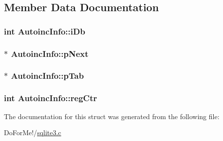 \subsection{Member Data Documentation}
\hypertarget{struct_autoinc_info_ae7234e0916b11ef97377bdfd6c7c4568}{
\subsubsection[{i\-Db}]{\setlength{\rightskip}{0pt plus 5cm}int Autoinc\-Info\-::i\-Db}}\label{struct_autoinc_info_ae7234e0916b11ef97377bdfd6c7c4568}
\hypertarget{struct_autoinc_info_aa77fb076beea013c25df4e49dba4b6f6}{
\subsubsection[{p\-Next}]{$\ast$ Autoinc\-Info\-::p\-Next}}\label{struct_autoinc_info_aa77fb076beea013c25df4e49dba4b6f6}
\hypertarget{struct_autoinc_info_a0cf785b0cbaddb4215a8408f8e13075e}{
\subsubsection[{p\-Tab}]{$\ast$ Autoinc\-Info\-::p\-Tab}}\label{struct_autoinc_info_a0cf785b0cbaddb4215a8408f8e13075e}
\hypertarget{struct_autoinc_info_af180977ee7dcc8cab862185692f57cc5}{
\subsubsection[{reg\-Ctr}]{\setlength{\rightskip}{0pt plus 5cm}int Autoinc\-Info\-::reg\-Ctr}}\label{struct_autoinc_info_af180977ee7dcc8cab862185692f57cc5}


The documentation for this struct was generated from the following file\-:\begin{DoxyCompactItemize}
\item 
Do\-For\-Me!/\hyperlink{sqlite3_8c}{sqlite3.\-c}\end{DoxyCompactItemize}
